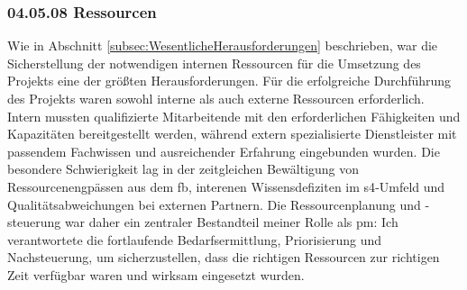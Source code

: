 \subsubsection*{04.05.08 Ressourcen} 
\label{sec:04.05.08.Ressourcen}

\par Wie in Abschnitt \ref{subsec:WesentlicheHerausforderungen} beschrieben, war die Sicherstellung der notwendigen internen Ressourcen für die Umsetzung des Projekts eine der größten Herausforderungen. Für die erfolgreiche Durchführung des Projekts waren sowohl interne als auch externe Ressourcen erforderlich. Intern mussten qualifizierte Mitarbeitende mit den erforderlichen Fähigkeiten und Kapazitäten bereitgestellt werden, während extern spezialisierte Dienstleister mit passendem Fachwissen und ausreichender Erfahrung eingebunden wurden. Die besondere Schwierigkeit lag in der zeitgleichen Bewältigung von Ressourcenengpässen aus dem \gls{fb}, interenen Wissensdefiziten im \gls{s4}-Umfeld und Qualitätsabweichungen bei externen Partnern. Die Ressourcenplanung und -steuerung war daher ein zentraler Bestandteil meiner Rolle als \gls{pm}: Ich verantwortete die fortlaufende Bedarfsermittlung, Priorisierung und Nachsteuerung, um sicherzustellen, dass die richtigen Ressourcen zur richtigen Zeit verfügbar waren und wirksam eingesetzt wurden.